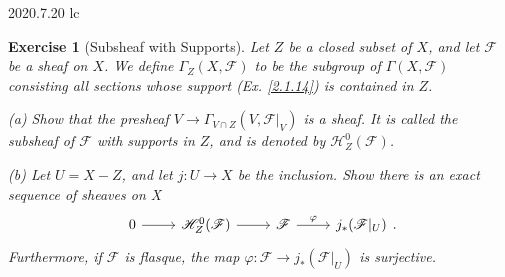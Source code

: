\documentclass{amsart}
\newtheorem{exe}{Exercise}[subsection]
\theoremstyle{remark}\newtheorem{rmk}[theorem]{Remark}
\begin{document}
2020.7.20 lc

\begin{exe}[Subsheaf with Supports]
	\label{2.1.20}
	Let $Z$ be a closed subset of $X$, and let $\mathscr{F}$ be a sheaf on $X$. We define $\Gamma_Z(X,\mathscr{F})$ to be the subgroup of $\Gamma(X,\mathscr{F})$ consisting all sections whose support \textup{(Ex. \ref{2.1.14})} is contained in $Z$.
	
	(a) Show that the presheaf $V\to\Gamma_{V\cap Z}(V,\mathscr{F}|_V)$ is a sheaf. It is called the subsheaf of $\mathscr{F}$ with supports in $Z$, and is denoted by $\mathscr{H}_Z^0(\mathscr{F})$.
	
	(b) Let $U=X-Z$, and let $j:U\to X$ be the inclusion. Show there is an exact sequence of sheaves on X
	\begin{equation*}
		\begin{tikzcd}
			0 \arrow[r] & \mathscr{H}_Z^0(\mathscr{F}) \arrow[r] & \mathscr{F} \arrow[r, "\varphi"] & j_*(\mathscr{F}|_U)
		\end{tikzcd}.
	\end{equation*}
	Furthermore, if $\mathscr{F}$ is flasque, the map $\varphi:\mathscr{F}\to j_*(\mathscr{F}|_U)$ is surjective.
\end{exe}
\end{document}
